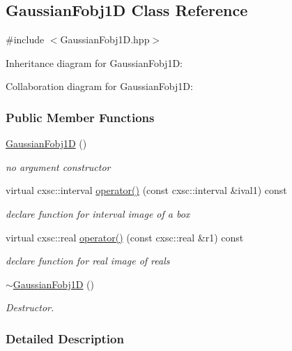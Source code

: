 \hypertarget{classGaussianFobj1D}{\subsection{\-Gaussian\-Fobj1\-D \-Class \-Reference}
\label{classGaussianFobj1D}
}


{\ttfamily \#include $<$\-Gaussian\-Fobj1\-D.\-hpp$>$}



\-Inheritance diagram for \-Gaussian\-Fobj1\-D\-:


\-Collaboration diagram for \-Gaussian\-Fobj1\-D\-:
\subsubsection*{\-Public \-Member \-Functions}
\begin{DoxyCompactItemize}
\item 
\hyperlink{classGaussianFobj1D_ac2ebc621272f34bdefc167915de37baa}{\-Gaussian\-Fobj1\-D} ()
\begin{DoxyCompactList}\small\item\em no argument constructor \end{DoxyCompactList}\item 
virtual cxsc\-::interval \hyperlink{classGaussianFobj1D_a4c8a93079864c66b0ddcf4e2f4e2c8d3}{operator()} (const cxsc\-::interval \&ival1) const 
\begin{DoxyCompactList}\small\item\em declare function for interval image of a box \end{DoxyCompactList}\item 
virtual cxsc\-::real \hyperlink{classGaussianFobj1D_ae5d44cda5b13788312d4d013883b1693}{operator()} (const cxsc\-::real \&r1) const 
\begin{DoxyCompactList}\small\item\em declare function for real image of reals \end{DoxyCompactList}\item 
\hyperlink{classGaussianFobj1D_a62788221f6da7d961ba804d99c8dc89a}{$\sim$\-Gaussian\-Fobj1\-D} ()
\begin{DoxyCompactList}\small\item\em \-Destructor. \end{DoxyCompactList}\end{DoxyCompactItemize}


\subsubsection{\-Detailed \-Description}


